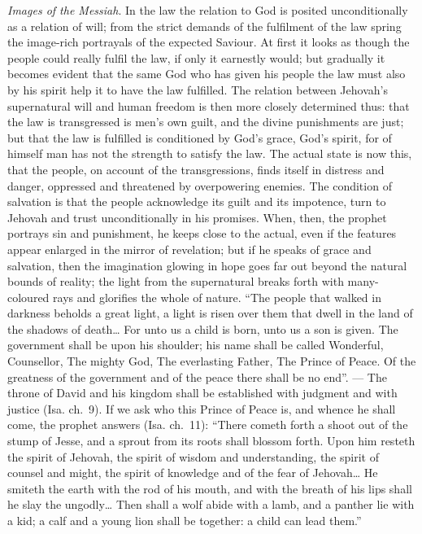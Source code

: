 \documentclass[12pt,a4paper,openany]{book}
\newcommand{\opage}[1]{\marginnote{\footnotesize\textit{[#1]}}}
\begin{document}
\emph{Images of the Messiah}. In the law the relation to God is
posited unconditionally as a relation of will; from the
strict demands of the fulfilment of the law spring the image-rich portrayals
of the expected Saviour. At first it looks as
though the people could really fulfil the law, if only it earnestly
would; but gradually it becomes evident
that the same God who has given his people the law
must also by his spirit help it to have the law
fulfilled. The relation between Jehovah's supernatural will
and human freedom is then more closely determined
thus: that the law is transgressed is men's own
guilt, and the divine punishments are just; but that
the law is fulfilled is conditioned by God's grace, God's
spirit, for of himself man has not the strength to
satisfy the law. The actual state is now this,
that the people, on account of the transgressions, finds itself in
distress and danger, oppressed and threatened by overpowering enemies.
The condition of salvation is that the people acknowledge its guilt and
its impotence, turn to Jehovah and trust unconditionally
in his promises. When, then, the prophet portrays
sin and punishment, he keeps close to the actual,
even if the features appear enlarged in the mirror of revelation;
but if he speaks of grace and salvation,
then the imagination glowing in hope goes far out
beyond the natural bounds of reality; the light from the
supernatural breaks forth with many-coloured rays and
glorifies the whole of nature. ``The people that walked in
darkness beholds a great light, a light is risen over them
\setcounter{footnote}{0}%
\opage{54}that dwell in the land of the shadows of death\dots{} For unto us a child
is born, unto us a son is given. The government shall
be upon his shoulder; his name shall be called Wonderful,
Counsellor, The mighty God, The everlasting Father, The Prince
of Peace. Of the greatness of the government and of the peace
there shall be no end''. --- The throne of David and his kingdom
shall be established with judgment and with justice (Isa. ch.~9).
If we ask who this Prince of Peace is, and whence he
shall come, the prophet answers (Isa. ch.~11):
``There cometh forth a shoot out of the stump of Jesse, and a sprout from
its roots shall blossom forth. Upon him resteth the spirit
of Jehovah, the spirit of wisdom and understanding, the spirit of counsel and
might, the spirit of knowledge and of the fear of Jehovah\dots{}
He smiteth the earth with the rod of his mouth, and with the breath of his
lips shall he slay the ungodly\dots{} Then
shall a wolf abide with a lamb, and a panther lie
with a kid; a calf and a young lion shall be
together: a child can lead them.''
\end{document}
